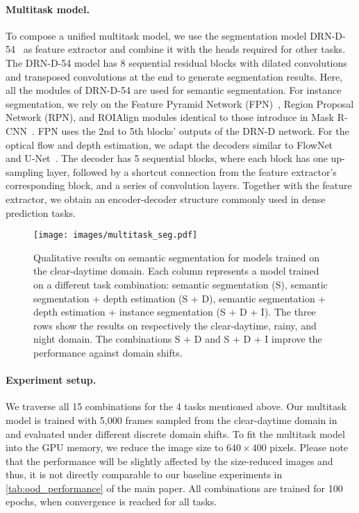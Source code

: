 \paragraph{Multitask model.} To compose a unified multitask model, we use the segmentation model DRN-D-54~ as feature extractor and combine it with the heads required for other tasks. The DRN-D-54 model has 8 sequential residual blocks with dilated convolutions and transposed convolutions at the end to generate segmentation results. 
Here, all the modules of DRN-D-54 are used for semantic segmentation. For instance segmentation, we rely on the Feature Pyramid Network (FPN)~, Region Proposal Network (RPN), and ROIAlign modules identical to those introduce in Mask R-CNN~. 
FPN uses the 2nd to 5th blocks' outputs of the DRN-D network. For the optical flow and depth estimation, we adapt the decoders similar to FlowNet~ and U-Net~. The decoder has 5 sequential blocks, where each block has one up-sampling layer, followed by a shortcut connection from the feature extractor's corresponding block, and a series of convolution layers. Together with the feature extractor, we obtain an encoder-decoder structure commonly used in dense prediction tasks.

\begin{figure*}[!t]
    \centering
    \texttt{[image: images/multitask\_seg.pdf]}
    \caption{Qualitative results on semantic segmentation for models trained on the clear-daytime domain. Each column represents a model trained on a different task combination: semantic segmentation (S), semantic segmentation + depth estimation (S + D), semantic segmentation + depth estimation + instance segmentation (S + D + I). The three rows show the results on respectively the clear-daytime, rainy, and night domain. The combinations S + D and S + D + I improve the performance against domain shifts.}
    \label{fig:multitask_seg}
\end{figure*}

\paragraph{Experiment setup.} We traverse all 15 combinations for the 4 tasks mentioned above.
Our multitask model is trained with 5,000 frames sampled from the clear-daytime domain in \thedataset{} and evaluated under different discrete domain shifts. To fit the multitask model into the GPU memory, we reduce the image size to $640 \times 400$ pixels. 
Please note that the performance will be slightly affected by the size-reduced images and thus, it is not directly comparable to our baseline experiments in \ref{tab:ood_performance} of the main paper.
All combinations are trained for 100 epochs, when convergence is reached for all tasks. 


